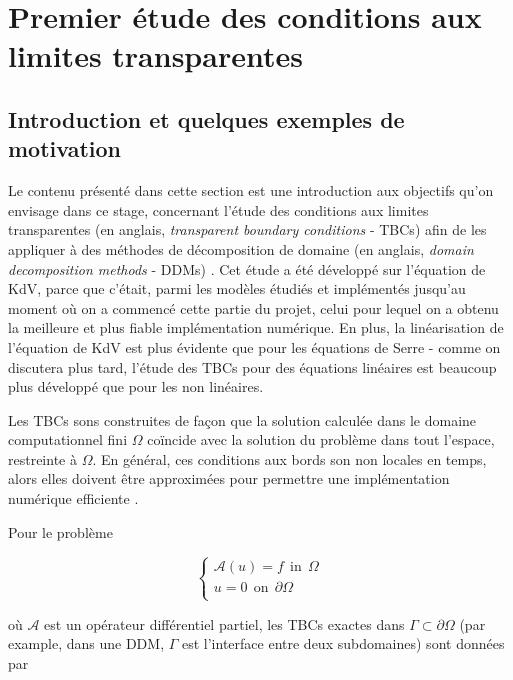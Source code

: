 \section{Premier étude des conditions aux limites transparentes}
\label{sec:TBC}

\subsection{Introduction et quelques exemples de motivation}

\indent Le contenu présenté dans cette section est une introduction aux objectifs qu'on envisage dans ce stage, concernant l'étude des conditions aux limites transparentes (en anglais, \emph{transparent boundary conditions} - TBCs) afin de les appliquer à des méthodes de décomposition de domaine (en anglais, \emph{domain decomposition methods} - DDMs) . Cet étude a été développé sur l'équation de KdV, parce que c'était, parmi les modèles étudiés et implémentés jusqu'au moment où on a commencé cette partie du projet, celui pour lequel on a obtenu la meilleure et plus fiable implémentation numérique. En plus, la linéarisation de l'équation de KdV est plus évidente que pour les équations de Serre - comme on discutera plus tard, l'étude des TBCs pour des équations linéaires est beaucoup plus développé que pour les non linéaires.

\indent Les TBCs sons construites de façon que la solution calculée dans le domaine computationnel fini $\Omega$ coïncide avec la solution du problème dans tout l'espace, restreinte à $\Omega$. En général, ces conditions aux bords son non locales en temps, alors elles doivent être approximées pour permettre une implémentation numérique efficiente \cite{Xavieretal2008}.

\indent Pour le problème

\begin{equation*}
\begin{cases}
\mathcal{A}(u) = f \ \ \text{in} \ \ \Omega\\
u = 0 \ \ \text{on} \ \ \partial\Omega\\
\end{cases}
\end{equation*}

\noindent où $\mathcal{A}$ est un opérateur différentiel partiel, les TBCs exactes dans $\Gamma \subset \partial\Omega$ (par example, dans une DDM, $\Gamma$ est l'interface entre deux subdomaines) sont données par \cite{Japhet2003}

